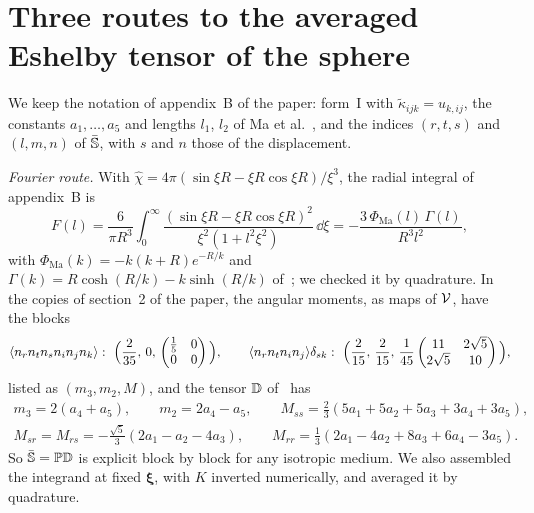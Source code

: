 \section{Three routes to the averaged Eshelby tensor of the sphere}\label{sup:eshelby}

We keep the notation of appendix~B of the paper: form~I with $\tilde\kappa_{ijk}=u_{k,ij}$,
the constants $a_1,\dots,a_5$ and lengths $l_1$, $l_2$ of Ma et al.~\cite{Ma2018}, and the
indices $(r,t,s)$ and $(l,m,n)$ of $\bar{\mathbb{S}}$, with $s$ and $n$ those of the displacement.

\emph{Fourier route.} With $\hat\chi=4\pi(\sin\xi R-\xi R\cos\xi R)/\xi^3$, the radial
integral of appendix~B is
\begin{equation}
F(l)=\frac{6}{\pi R^3}\int_0^\infty\frac{(\sin\xi R-\xi R\cos\xi R)^2}{\xi^2(1+l^2\xi^2)}\,\dd\xi
=-\frac{3\,\Phi_{\mathrm{Ma}}(l)\,\Gamma(l)}{R^3l^2},
\end{equation}
with $\Phi_{\mathrm{Ma}}(k)=-k(k+R)e^{-R/k}$ and $\Gamma(k)=R\cosh(R/k)-k\sinh(R/k)$
of~\cite[eq.~(B.13)]{Ma2018}; we checked it by quadrature. In the copies of section~2 of the
paper, the angular moments, as maps of $\mathcal{V}$, have the blocks
\begin{equation}
\avg{n_rn_tn_sn_in_jn_k}:\ \Big(\frac2{35},\,0,\,\begin{pmatrix}\frac15&0\\0&0\end{pmatrix}\Big),
\qquad
\avg{n_rn_tn_in_j}\delta_{sk}:\ \Big(\frac2{15},\,\frac2{15},\,
\frac1{45}\begin{pmatrix}11&2\sqrt5\\2\sqrt5&10\end{pmatrix}\Big),
\end{equation}
listed as $(m_3,m_2,M)$, and the tensor $\mathbb{D}$ of~\cite[eq.~(2.6)]{Ma2018} has
\begin{equation}
\begin{gathered}
m_3=2(a_4+a_5),\qquad m_2=2a_4-a_5,\qquad
M_{ss}=\tfrac23(5a_1+5a_2+5a_3+3a_4+3a_5),\\
M_{sr}=M_{rs}=-\tfrac{\sqrt5}{3}(2a_1-a_2-4a_3),\qquad
M_{rr}=\tfrac13(2a_1-4a_2+8a_3+6a_4-3a_5).
\end{gathered}
\end{equation}
So $\bar{\mathbb{S}}=\mathbb P\mathbb{D}$ is explicit block by block for any isotropic medium. We also assembled
the integrand at fixed $\bm\xi$, with $K$ inverted numerically, and averaged it by quadrature.

